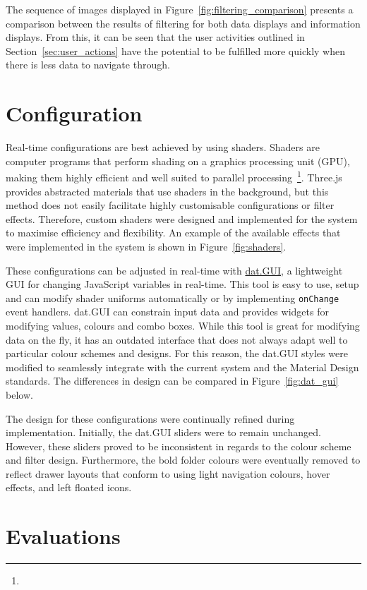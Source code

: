 {	The sequence of images displayed in Figure~\ref{fig:filtering_comparison} presents a comparison between the results of filtering for both data displays and information displays. From this, it can be seen that the user activities outlined in Section~\ref{sec:user_actions} have the potential to be fulfilled more quickly when there is less data to navigate through.

	

}

\section{Configuration} {
\label{sec:configuration_implementation}

	Real-time configurations are best achieved by using shaders. Shaders are computer programs that perform shading on a graphics processing unit (GPU), making them highly efficient and well suited to parallel processing~\footnote{}. Three.js provides abstracted materials that use shaders in the background, but this method does not easily facilitate highly customisable configurations or filter effects. Therefore, custom shaders were designed and implemented for the system to maximise efficiency and flexibility. An example of the available effects that were implemented in the system is shown in Figure~\ref{fig:shaders}.

	

	These configurations can be adjusted in real-time with \href{http://workshop.chromeexperiments.com/}{dat.GUI}, a lightweight GUI for changing JavaScript variables in real-time. This tool is easy to use, setup and can modify shader uniforms automatically or by implementing \texttt{onChange} event handlers. dat.GUI can constrain input data and provides widgets for modifying values, colours and combo boxes. While this tool is great for modifying data on the fly, it has an outdated interface that does not always adapt well to particular colour schemes and designs. For this reason, the dat.GUI styles were modified to seamlessly integrate with the current system and the Material Design standards. The differences in design can be compared in Figure~\ref{fig:dat_gui} below.

	

	The design for these configurations were continually refined during implementation. Initially, the dat.GUI sliders were to remain unchanged. However, these sliders proved to be inconsistent in regards to the colour scheme and filter design. Furthermore, the bold folder colours were eventually removed to reflect drawer layouts that conform to using light navigation colours, hover effects, and left floated icons.

}

\section{Evaluations} {
\label{sec:evaluations}



}
